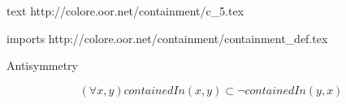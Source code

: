 text http://colore.oor.net/containment/c_5.tex

imports http://colore.oor.net/containment/containment_def.tex

Antisymmetry

\begin{equation}
(\forall x,y) containedIn(x,y) \subset \neg containedIn(y,x)
\end{equation}
